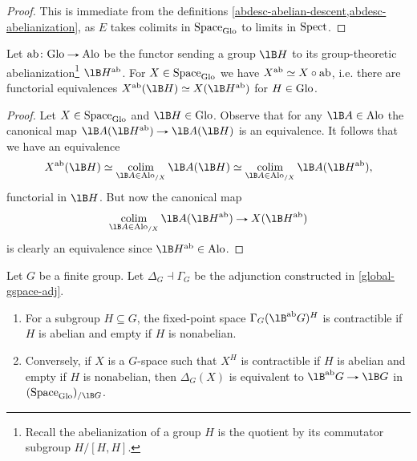 \begin{proof}
  This is immediate from the definitions
  \cref{abdesc-abelian-descent,abdesc-abelianization}, as $E$ takes
  colimits in $\mathrm{Space}_{\mathrm{Glo}}$ to limits in $\mathrm{Spect}$.
\end{proof}

\begin{lemma}
  \label{abdesc-abelianization-alternate}
  Let $\ab \c \Glo \to \Alo$ be the functor sending a group $\lB H$ to
  its group-theoretic abelianization\footnote{Recall the
    abelianization of a group $H$ is the quotient by its commutator
    subgroup $H/[H,H]$.}  $\lB H^\ab$. For $X \in \mathrm{Space}_{\mathrm{Glo}}$ we have
  $X^{\mathrm{ab}} \simeq X \circ \mathrm{ab}$, i.e. there are functorial equivalences
  $X^\ab(\lB H) \iso X(\lB H^\ab)$ for $H \in \mathrm{Glo}$.
\end{lemma}

\begin{proof}
  Let $X \in \mathrm{Space}_{\mathrm{Glo}}$ and $\lB H \in \Glo$. Observe that for any
  $\lB A \in \Alo$ the canonical map
  $\lB A(\lB H^\ab) \to \lB A(\lB H)$ is an equivalence. It follows
  that we have an equivalence
  \[
  X^\ab(\lB H) \iso
  \colim_{\lB A \in \Alo_{/X}} \lB A(\lB H) \iso
  \colim_{\lB A \in \Alo_{/X}} \lB A(\lB H^\ab),
  \]
  functorial in $\lB H$. But now the canonical map
  \[
  \colim_{\lB A \in \Alo_{/X}} \lB A(\lB H^\ab) \to X(\lB H^\ab)
  \]
  is clearly an equivalence since $\lB H^\ab \in \Alo$.
\end{proof}

\begin{lemma}
  \label{abdesc-abelianization-as-Gspace}
  Let $G$ be a finite group. Let $\Delta_G \dashv \Gamma_G$ be the
  adjunction constructed in \cref{global-gspace-adj}.
  \begin{enumerate}
  \item \label{abdesc-abelianization-gamma} For a subgroup
    $H \subseteq G$, the fixed-point space $\Gamma_G(\lB^\ab G)^H$ is
    contractible if $H$ is abelian and empty if $H$ is nonabelian.
  \item \label{abdesc-abelianization-delta} Conversely, if $X$ is a
    $G$-space such that $X^H$ is contractible if $H$ is abelian and
    empty if $H$ is nonabelian, then $\Delta_G(X)$ is equivalent to
    $\lB^\ab G \to \lB G$ in $(\Space_\Glo)_{/\lB G}$.
  \end{enumerate}
\end{lemma}

